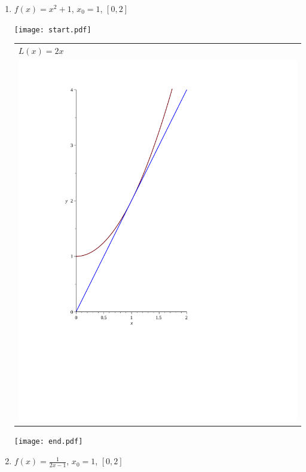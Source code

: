 \documentclass[12pt]{article}
\begin{document}
\begin{enumerate}

\item $f(x)=x^2+1$, $x_0=1$, $[0,2]$

\texttt{[image: start.pdf]}
{{\begin{tabular}{l}
$L(x)=2x$\\
\includegraphics[scale=0.3]{graph1.pdf}
\end{tabular}
}}
\texttt{[image: end.pdf]}


\item $f(x)=\frac{1}{2x-1}$, $x_0=1$, $[0,2]$


\end{enumerate}
\end{document}
